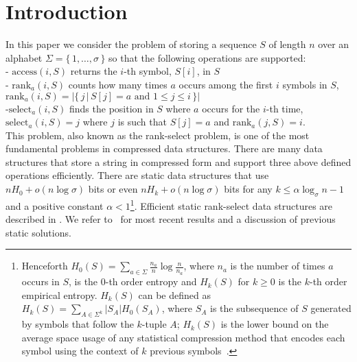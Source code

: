 \documentclass[11pt]{article}\usepackage{fullpage}
\def\idrm#1{\ensuremath{\mathrm{#1}}}
\newcommand{\ra}{\idrm{rank}}
\newcommand{\sel}{\idrm{select}}
\newcommand{\acc}{\idrm{access}}
\begin{document}
\section{Introduction}
In this paper we consider the problem of storing a sequence $S$ of length $n$ over an alphabet $\Sigma=\{\,1,\ldots,\sigma\,\}$ so that the following operations are supported:\\
- $\acc(i,S)$ returns the $i$-th symbol, $S[i]$, in $S$\\
- $\ra_a(i,S)$ counts how many times $a$ occurs among the first $i$ symbols 
in $S$, $\ra_a(i,S)=|\{\,j\,|\, S[j]=a \text{ and } 1\le j\le i\,\}|$\\
-$\sel_a(i,S)$ finds the position in $S$ where $a$ occurs for the $i$-th time,
$\sel_a(i,S)=j$ where $j$ is such that  $S[j]=a$ and $\ra_a(j,S)=i$. \\
This problem, also known as the rank-select problem, is one of the most fundamental problems in compressed data structures. 
There are many  data structures that store a string in compressed form and support three above defined operations efficiently. There are static data structures that use $nH_0+o(n\log\sigma)$ bits 
or even $nH_k+o(n\log \sigma)$ bits for any $k\le  \alpha\log_{\sigma}n-1$  and a positive constant $\alpha<1$\footnote{Henceforth $H_0(S)=\sum_{a\in \Sigma}\frac{n_a}{n}\log\frac{n}{n_a}$, where $n_a$ is the number of times $a$ occurs in $S$, 
is the $0$-th order entropy and  $H_k(S)$ for $k\ge 0$ is the $k$-th order empirical entropy. $H_k(S)$ can be defined as 
$H_k(S)=\sum_{A\in \Sigma^k}|S_A|H_0(S_A)$, where $S_A$ is the subsequence of $S$ generated by symbols that follow the $k$-tuple $A$; $H_k(S)$ is the lower bound on the average space
usage of any statistical compression method that encodes each symbol using the context of $k$ previous symbols~\cite{Manzini01}.}. Efficient static rank-select data structures are described in \cite{GGV03,GMR06,FMMN07,LP07,LP09,BGNN10,HM10,NS14,BN12}. We refer to~\cite{BN12} for most recent results and a discussion of previous static solutions.
\end{document}
